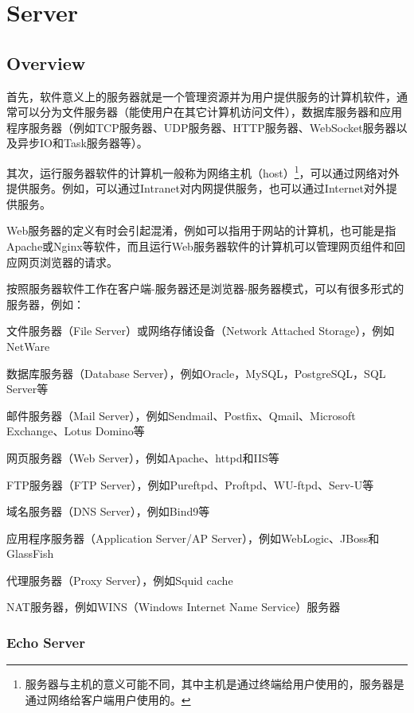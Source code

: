 \part{Server}




\chapter{Overview}

首先，软件意义上的服务器就是一个管理资源并为用户提供服务的计算机软件，通常可以分为文件服务器（能使用户在其它计算机访问文件），数据库服务器和应用程序服务器（例如TCP服务器、UDP服务器、HTTP服务器、WebSocket服务器以及异步IO和Task服务器等）。


其次，运行服务器软件的计算机一般称为网络主机（host）\footnote{服务器与主机的意义可能不同，其中主机是通过终端给用户使用的，服务器是通过网络给客户端用户使用的。}，可以通过网络对外提供服务。例如，可以通过Intranet对内网提供服务，也可以通过Internet对外提供服务。

Web服务器的定义有时会引起混淆，例如可以指用于网站的计算机，也可能是指Apache或Nginx等软件，而且运行Web服务器软件的计算机可以管理网页组件和回应网页浏览器的请求。

按照服务器软件工作在客户端-服务器还是浏览器-服务器模式，可以有很多形式的服务器，例如：

\begin{compactitem}
\item 文件服务器（File Server）或网络存储设备（Network Attached Storage），例如NetWare
\item 数据库服务器（Database Server），例如Oracle，MySQL，PostgreSQL，SQL Server等
\item 邮件服务器（Mail Server），例如Sendmail、Postfix、Qmail、Microsoft Exchange、Lotus Domino等
\item 网页服务器（Web Server），例如Apache、httpd和IIS等
\item FTP服务器（FTP Server），例如Pureftpd、Proftpd、WU-ftpd、Serv-U等
\item 域名服务器（DNS Server），例如Bind9等
\item 应用程序服务器（Application Server/AP Server），例如WebLogic、JBoss和GlassFish
\item 代理服务器（Proxy Server），例如Squid cache
\item NAT服务器，例如WINS（Windows Internet Name Service）服务器
\end{compactitem}


\clearpage
\section{Echo Server} 


